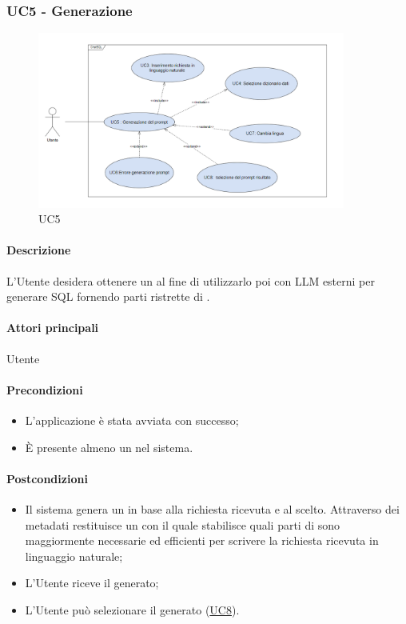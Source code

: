 \subsubsection{UC5 - Generazione }\label{UC5}

\begin{figure}[H]
  \centering
  \includegraphics[width=0.90\textwidth]{assets/uc5.png}
  \caption{UC5}
\end{figure}

\paragraph*{Descrizione}
L’Utente desidera ottenere un  al fine di utilizzarlo poi con LLM esterni per generare  SQL fornendo parti ristrette di .

\paragraph*{Attori principali}
Utente

\paragraph*{Precondizioni}
\begin{itemize}
  \item L'applicazione è stata avviata con successo;
  \item È presente almeno un  nel sistema.
\end{itemize}

\paragraph*{Postcondizioni}
\begin{itemize}
  \item Il sistema genera un  in base alla richiesta ricevuta e al  scelto. Attraverso dei metadati restituisce un  con il quale stabilisce quali parti di  sono maggiormente necessarie ed efficienti per scrivere la richiesta ricevuta in linguaggio naturale;
  \item L’Utente riceve il  generato;
  \item L'Utente può selezionare il  generato (\hyperref[UC8]{UC8}).
\end{itemize}

